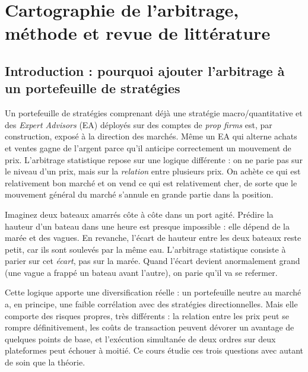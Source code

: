 \chapter{Cartographie de l'arbitrage, méthode et revue de littérature}
\label{ch:0}


\section{Introduction : pourquoi ajouter l'arbitrage à un portefeuille de stratégies}

Un portefeuille de stratégies comprenant déjà une stratégie macro/quantitative et des \emph{Expert Advisors} (EA) déployés sur des comptes de \emph{prop firms} est, par construction, exposé à la direction des marchés. Même un EA qui alterne achats et ventes gagne de l'argent parce qu'il anticipe correctement un mouvement de prix. L'arbitrage statistique repose sur une logique différente : on ne parie pas sur le niveau d'un prix, mais sur la \emph{relation} entre plusieurs prix. On achète ce qui est relativement bon marché et on vend ce qui est relativement cher, de sorte que le mouvement général du marché s'annule en grande partie dans la position.

\begin{intuition}
Imaginez deux bateaux amarrés côte à côte dans un port agité. Prédire la hauteur d'un bateau dans une heure est presque impossible : elle dépend de la marée et des vagues. En revanche, l'écart de hauteur entre les deux bateaux reste petit, car ils sont soulevés par la même eau. L'arbitrage statistique consiste à parier sur cet \emph{écart}, pas sur la marée. Quand l'écart devient anormalement grand (une vague a frappé un bateau avant l'autre), on parie qu'il va se refermer.
\end{intuition}

Cette logique apporte une diversification réelle : un portefeuille \og neutre au marché\fg{} a, en principe, une faible corrélation avec des stratégies directionnelles. Mais elle comporte des risques propres, très différents : la relation entre les prix peut se rompre définitivement, les coûts de transaction peuvent dévorer un avantage de quelques points de base, et l'exécution simultanée de deux ordres sur deux plateformes peut échouer à moitié. Ce cours étudie ces trois questions avec autant de soin que la théorie.

